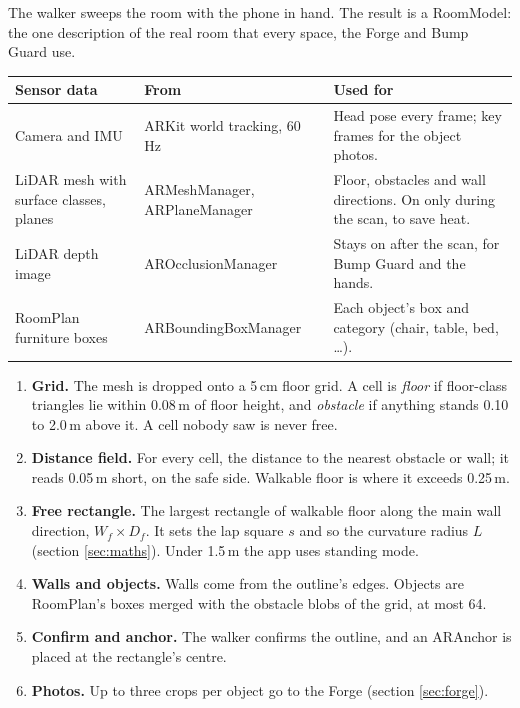 \documentclass[10pt]{article}
\newcounter{sec}
\newcommand{\Sec}[1]{\Needspace{38mm}\refstepcounter{sec}\vspace{5mm}%
  \noindent{\color{accD}\rule{\textwidth}{0.9pt}}\par\vspace{1mm}%
  \noindent{\Large\bfseries{\color{accD}\thesec}\hspace{3mm}#1}\par\vspace{1.5mm}}
\newcommand{\code}[1]{{\ttfamily\fontsize{8.8}{11}\selectfont #1}}
\begin{document}
\Sec{Scanning the room}

The walker sweeps the room with the phone in hand. The result is a \code{RoomModel}: the one description of the real room that every space, the Forge and Bump Guard use.

\begin{center}\small
\begin{tabularx}{\textwidth}{@{}l l >{\raggedright\arraybackslash}X@{}}
\toprule
\textbf{Sensor data} & \textbf{From} & \textbf{Used for}\\
\midrule
Camera and IMU & ARKit world tracking, 60\,Hz & Head pose every frame; key frames for the object photos.\\
LiDAR mesh with surface classes, planes & \code{ARMeshManager}, \code{ARPlaneManager} & Floor, obstacles and wall directions. On only during the scan, to save heat.\\
LiDAR depth image & \code{AROcclusionManager} & Stays on after the scan, for Bump Guard and the hands.\\
RoomPlan furniture boxes & \code{ARBoundingBoxManager} & Each object's box and category (chair, table, bed, \dots).\\
\bottomrule
\end{tabularx}
\end{center}

\begin{enumerate}
\item \textbf{Grid.} The mesh is dropped onto a 5\,cm floor grid. A cell is \emph{floor} if floor-class triangles lie within 0.08\,m of floor height, and \emph{obstacle} if anything stands 0.10 to 2.0\,m above it. A cell nobody saw is never free.
\item \textbf{Distance field.} For every cell, the distance to the nearest obstacle or wall; it reads 0.05\,m short, on the safe side. Walkable floor is where it exceeds 0.25\,m.
\item \textbf{Free rectangle.} The largest rectangle of walkable floor along the main wall direction, $W_f\times D_f$. It sets the lap square $s$ and so the curvature radius $L$ (section \ref{sec:maths}). Under 1.5\,m the app uses standing mode.
\item \textbf{Walls and objects.} Walls come from the outline's edges. Objects are RoomPlan's boxes merged with the obstacle blobs of the grid, at most 64.
\item \textbf{Confirm and anchor.} The walker confirms the outline, and an \code{ARAnchor} is placed at the rectangle's centre.
\item \textbf{Photos.} Up to three crops per object go to the Forge (section \ref{sec:forge}).
\end{enumerate}
\end{document}
